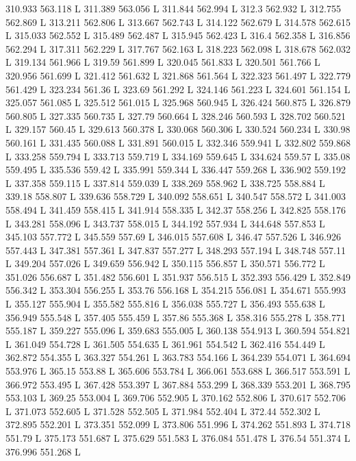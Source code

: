 310.933 563.118 L
311.389 563.056 L
311.844 562.994 L
312.3 562.932 L
312.755 562.869 L
313.211 562.806 L
313.667 562.743 L
314.122 562.679 L
314.578 562.615 L
315.033 562.552 L
315.489 562.487 L
315.945 562.423 L
316.4 562.358 L
316.856 562.294 L
317.311 562.229 L
317.767 562.163 L
318.223 562.098 L
318.678 562.032 L
319.134 561.966 L
319.59 561.899 L
320.045 561.833 L
320.501 561.766 L
320.956 561.699 L
321.412 561.632 L
321.868 561.564 L
322.323 561.497 L
322.779 561.429 L
323.234 561.36 L
323.69 561.292 L
324.146 561.223 L
324.601 561.154 L
325.057 561.085 L
325.512 561.015 L
325.968 560.945 L
326.424 560.875 L
326.879 560.805 L
327.335 560.735 L
327.79 560.664 L
328.246 560.593 L
328.702 560.521 L
329.157 560.45 L
329.613 560.378 L
330.068 560.306 L
330.524 560.234 L
330.98 560.161 L
331.435 560.088 L
331.891 560.015 L
332.346 559.941 L
332.802 559.868 L
333.258 559.794 L
333.713 559.719 L
334.169 559.645 L
334.624 559.57 L
335.08 559.495 L
335.536 559.42 L
335.991 559.344 L
336.447 559.268 L
336.902 559.192 L
337.358 559.115 L
337.814 559.039 L
338.269 558.962 L
338.725 558.884 L
339.18 558.807 L
339.636 558.729 L
340.092 558.651 L
340.547 558.572 L
341.003 558.494 L
341.459 558.415 L
341.914 558.335 L
342.37 558.256 L
342.825 558.176 L
343.281 558.096 L
343.737 558.015 L
344.192 557.934 L
344.648 557.853 L
345.103 557.772 L
345.559 557.69 L
346.015 557.608 L
346.47 557.526 L
346.926 557.443 L
347.381 557.361 L
347.837 557.277 L
348.293 557.194 L
348.748 557.11 L
349.204 557.026 L
349.659 556.942 L
350.115 556.857 L
350.571 556.772 L
351.026 556.687 L
351.482 556.601 L
351.937 556.515 L
352.393 556.429 L
352.849 556.342 L
353.304 556.255 L
353.76 556.168 L
354.215 556.081 L
354.671 555.993 L
355.127 555.904 L
355.582 555.816 L
356.038 555.727 L
356.493 555.638 L
356.949 555.548 L
357.405 555.459 L
357.86 555.368 L
358.316 555.278 L
358.771 555.187 L
359.227 555.096 L
359.683 555.005 L
360.138 554.913 L
360.594 554.821 L
361.049 554.728 L
361.505 554.635 L
361.961 554.542 L
362.416 554.449 L
362.872 554.355 L
363.327 554.261 L
363.783 554.166 L
364.239 554.071 L
364.694 553.976 L
365.15 553.88 L
365.606 553.784 L
366.061 553.688 L
366.517 553.591 L
366.972 553.495 L
367.428 553.397 L
367.884 553.299 L
368.339 553.201 L
368.795 553.103 L
369.25 553.004 L
369.706 552.905 L
370.162 552.806 L
370.617 552.706 L
371.073 552.605 L
371.528 552.505 L
371.984 552.404 L
372.44 552.302 L
372.895 552.201 L
373.351 552.099 L
373.806 551.996 L
374.262 551.893 L
374.718 551.79 L
375.173 551.687 L
375.629 551.583 L
376.084 551.478 L
376.54 551.374 L
376.996 551.268 L
